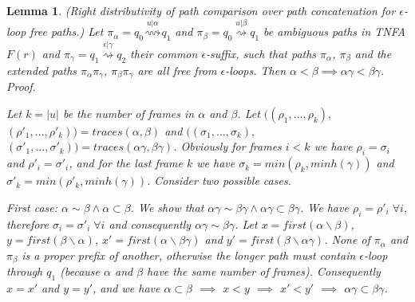 \documentclass[AMA,STIX1COL]{WileyNJD-v2}
\newtheorem{XLem}{Lemma}
\begin{document}
    \begin{XLem} \emph{(Right distributivity of path comparison over path concatenation for $\epsilon$-loop free paths.)}
    Let
    $\pi_\alpha = q_0 \overset {u | \alpha} {\rightsquigarrow} q_1$ and
    $\pi_\beta  = q_0 \overset {u | \beta}  {\rightsquigarrow} q_1$
    be ambiguous paths in TNFA $F(r)$
    and $\pi_\gamma = q_1 \overset {\epsilon | \gamma} {\rightsquigarrow} q_2$
    their common $\epsilon$-suffix,
    such that paths $\pi_\alpha$, $\pi_\beta$
    and the extended paths $\pi_\alpha \pi_\gamma$, $\pi_\beta \pi_\gamma$
    are all free from $\epsilon$-loops.
    Then $\alpha < \beta \implies \alpha \gamma < \beta \gamma$.
    \\
    Proof.

    Let $k = |u|$ be the number of frames in $\alpha$ and $\beta$.
    Let
    $\big( (\rho_1, \hdots, \rho_k),$ $(\rho'_1, \hdots, \rho'_k) \big) = traces (\alpha, \beta)$ and
    $\big( (\sigma_1, \hdots, \sigma_k),$ $(\sigma'_1, \hdots, \sigma'_k) \big) = traces (\alpha \gamma, \beta \gamma)$.
    Obviously for frames $i < k$ we have $\rho_i = \sigma_i$ and $\rho'_i = \sigma'_i$,
    and for the last frame $k$ we have
    $\sigma_k = min (\rho_k, minh (\gamma))$ and
    $\sigma'_k = min (\rho'_k, minh (\gamma))$.
    Consider two possible cases.

    First case: $\alpha \sim \beta \wedge \alpha \subset \beta$.
    We show that $\alpha \gamma \sim \beta \gamma \wedge \alpha \gamma \subset \beta \gamma$.
    We have $\rho_i = \rho'_i \; \forall i$, therefore
    $\sigma_i = \sigma'_i \; \forall i$ and consequently $\alpha \gamma \sim \beta \gamma$.
    Let
    $x = first (\alpha \backslash \beta)$,
    $y = first (\beta \backslash \alpha)$,
    $x' = first (\alpha \backslash \beta \gamma)$ and
    $y' = first (\beta \backslash \alpha \gamma)$.
    None of $\pi_\alpha$ and $\pi_\beta$ is a proper prefix of another,
    otherwise the longer path must contain $\epsilon$-loop through $q_1$
    (because $\alpha$ and $\beta$ have the same number of frames).
    Consequently $x = x'$ and $y = y'$, and we have
    $\alpha \subset \beta$
    $\implies$
    $x < y$
    $\implies$
    $x' < y'$
    $\implies$
    $\alpha \gamma \subset \beta \gamma$.


\end{XLem}
\end{document}
